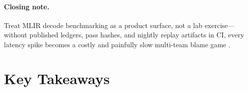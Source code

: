 \paragraph{Closing note.} Treat MLIR decode benchmarking as a product surface, not a lab exercise---without published ledgers, pass hashes, and nightly replay artifacts in CI, every latency spike becomes a costly and painfully slow multi-team blame game \citep{yirage2026,patel2025llminference,memoryfloor2026,taxbreak2026,chen2020compilerbasedhardw,kwon2023vllm,liu2024deepseekv3,amd2024aie,amd2024xdna,dao2022flashattention,dao2023flashdecoding,nvidia2024cudagraphs,nvidia2022hopper,semianalysis2024tma,dlbook}.

\section{Key Takeaways}
\label{sec:ch14_key_takeaways}

